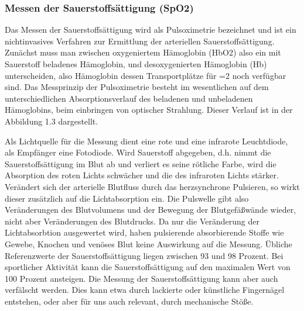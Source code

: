\subsubsection{Messen der Sauerstoffs{\"a}ttigung (SpO2)} \label{grund-spo2-subsubsec}


Das Messen der Sauerstoffsättigung wird als Pulsoximetrie bezeichnet und ist ein nichtinvasives Verfahren zur Ermittlung der arteriellen Sauerstoffsättigung. Zunächst muss man zwischen oxygeniertem Hämoglobin (HbO2) also ein mit Sauerstoff beladenes Hämoglobin, und desoxygenierten Hämoglobin (Hb) unterscheiden, also Hämoglobin dessen Transportplätze für =2 noch verfügbar sind. Das Messprinzip der Pulsoximetrie besteht im wesentlichen auf dem unterschiedlichen Absorptionsverlauf des beladenen und unbeladenen Hämoglobins, beim einbringen von optischer Strahlung. Dieser Verlauf ist in der Abbildung 1.3 dargestellt.


Als Lichtquelle für die Messung dient eine rote und eine infrarote Leuchtdiode, als Empfänger
eine Fotodiode. Wird Sauerstoff abgegeben, d.h. nimmt die Sauerstoffsättigung im Blut ab
und verliert es seine rötliche Farbe, wird die Absorption des roten Lichts schwächer und die
des infraroten Lichts stärker. Verändert sich der arterielle Blutfluss durch das herzsynchrone Pulsieren, so wirkt dieser zusätzlich auf die Lichtabsorption ein. Die Pulswelle gibt also Veränderungen des Blutvolumens und der Bewegung der Blutgefäßwände wieder, nicht aber Veränderungen des Blutdrucks.  Da nur die Veränderung der Lichtabsorbtion ausgewertet wird, haben pulsierende absorbierende Stoffe wie Gewebe, Knochen und venöses Blut keine Auswirkung auf die Messung. Übliche Referenzwerte der Sauerstoffsättigung liegen zwischen 93 und 98 Prozent. Bei sportlicher Aktivität kann die Sauerstoffsättigung auf den maximalen Wert von 100 Prozent ansteigen. Die Messung der Sauerstoffsättigung kann aber auch verfälscht werden. Dies kann etwa durch lackierte oder künstliche Fingernägel entstehen, oder aber für uns auch relevant, durch mechanische Stöße.  

